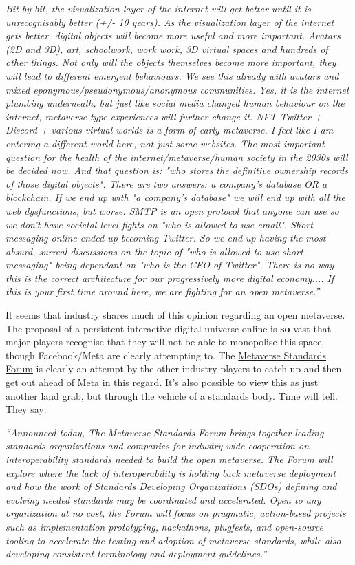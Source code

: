 \textit{Bit by bit, the visualization layer of the internet will get better until it is unrecognisably better (+/- 10 years). As the visualization layer of the internet gets better, digital objects will become more useful and more important. Avatars (2D and 3D), art, schoolwork, work work, 3D virtual spaces and hundreds of other things. Not only will the objects themselves become more important, they will lead to different emergent behaviours. We see this already with avatars and mixed eponymous/pseudonymous/anonymous communities. Yes, it is the internet plumbing underneath, but just like social media changed human behaviour on the internet, metaverse type experiences will further change it. NFT Twitter + Discord + various virtual worlds is a form of early metaverse. I feel like I am entering a different world here, not just some websites. The most important question for the health of the internet/metaverse/human society in the 2030s will be decided now. And that question is: "who stores the definitive ownership records of those digital objects". There are two answers: a company's database OR a blockchain. If we end up with "a company's database" we will end up with all the web dysfunctions, but worse. SMTP is an open protocol that anyone can use so we don't have societal level fights on "who is allowed to use email". Short messaging online ended up becoming Twitter. So we end up having the most absurd, surreal discussions on the topic of "who is allowed to use short-messaging" being dependant on "who is the CEO of Twitter". There is no way this is the correct architecture for our progressively more digital economy.... If this is your first time around here, we are fighting for an open metaverse.''}\par
It seems that industry shares much of this opinion regarding an open metaverse. The proposal of a persistent interactive digital universe online is \textbf{so} vast that major players recognise that they will not be able to monopolise this space, though Facebook/Meta are clearly attempting to. The \href{https://metaverse-standards.org/news/press-releases/leading-standards-organizations-and-companies-unite-to-drive-open-metaverse-interoperability/}{Metaverse Standards Forum} is clearly an attempt by the other industry players to catch up and then get out ahead of Meta in this regard. It's also possible to view this as just another land grab, but through the vehicle of a standards body. Time will tell. They say:\par
\textit{``Announced today, The Metaverse Standards Forum brings together leading standards organizations and companies for industry-wide cooperation on interoperability standards needed to build the open metaverse. The Forum will explore where the lack of interoperability is holding back metaverse deployment and how the work of Standards Developing Organizations (SDOs) defining and evolving needed standards may be coordinated and accelerated. Open to any organization at no cost, the Forum will focus on pragmatic, action-based projects such as implementation prototyping, hackathons, plugfests, and open-source tooling to accelerate the testing and adoption of metaverse standards, while also developing consistent terminology and deployment guidelines.''}\par
